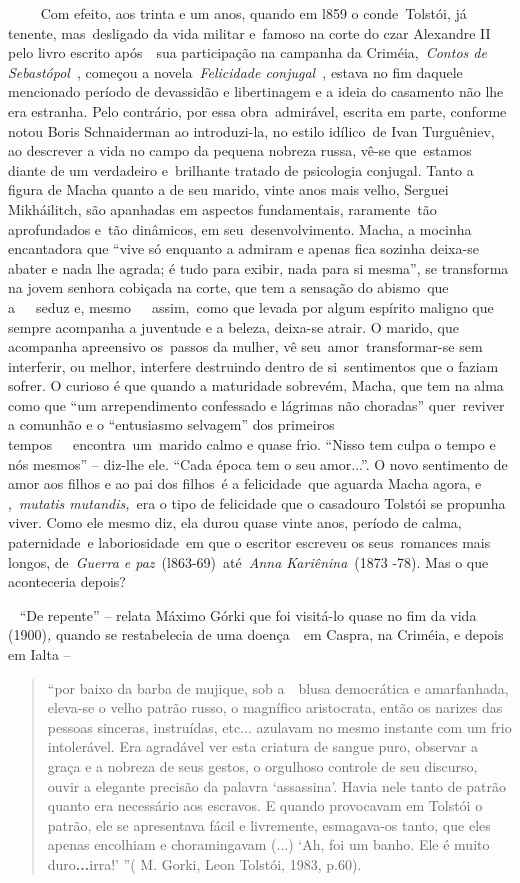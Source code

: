 ~~~~ Com efeito, aos trinta e um anos, quando em l859 o conde~Tolstói,
já tenente, mas~desligado da vida militar e~famoso na corte do czar
Alexandre II pelo livro escrito após~~sua participação na campanha da
Criméia,~\emph{Contos de Sebastópol}~, começou a novela~\emph{Felicidade
conjugal~}, estava no fim daquele mencionado período de devassidão e
libertinagem e a ideia do casamento não lhe era estranha. Pelo
contrário, por essa obra~admirável, escrita em parte, conforme notou
Boris Schnaiderman ao introduzi-la, no estilo idílico~de Ivan
Turguêniev, ao descrever a vida no campo da pequena nobreza russa, vê-se
que~estamos diante de um verdadeiro e~brilhante tratado de psicologia
conjugal. Tanto a figura de Macha quanto a de seu marido, vinte anos
mais velho, Serguei Mikháilitch, são apanhadas em aspectos fundamentais,
raramente~tão aprofundados e~tão dinâmicos, em seu~desenvolvimento.
Macha, a mocinha encantadora que ``vive só enquanto a admiram e apenas
fica sozinha deixa-se abater e nada lhe agrada; é tudo para exibir, nada
para si mesma'', se transforma na jovem senhora cobiçada na corte, que
tem a sensação do abismo~que a~~~seduz e, mesmo~~~assim,~como que levada
por algum espírito maligno que sempre acompanha a juventude e a beleza,
deixa-se atrair. O marido, que acompanha apreensivo os~passos da mulher,
vê seu~amor~transformar-se sem interferir, ou melhor, interfere
destruindo dentro de si~sentimentos que o faziam sofrer. O curioso é que
quando a maturidade sobrevém, Macha, que tem na alma como que ``um
arrependimento confessado e lágrimas não choradas'' quer~reviver a
comunhão e o ``entusiasmo selvagem'' dos primeiros
tempos~~~encontra~um~marido calmo e quase frio. ``Nisso tem culpa o
tempo e nós mesmos'' -- diz-lhe ele. ``Cada época tem o seu amor...''. O
novo sentimento de amor aos filhos e ao pai dos filhos~é a
felicidade~que aguarda Macha agora, e ,~\emph{mutatis mutandis,}~era o
tipo de felicidade que o casadouro Tolstói se propunha viver. Como ele
mesmo diz, ela durou quase vinte anos, período de calma, paternidade~e
laboriosidade~em que o escritor escreveu os seus~romances mais longos,
de~\emph{Guerra e paz}~(l863-69)~até~\emph{Anna Kariênina}~(1873 -78).
Mas o que aconteceria depois?

~ ``De repente'' -- relata Máximo Górki que foi visitá-lo quase no fim
da vida (1900)\emph{,} quando se restabelecia de uma doença~~em Caspra,
na Criméia, e depois em Ialta --

\begin{quote}
``por baixo da barba de mujique, sob a~~blusa democrática e amarfanhada,
eleva-se o velho patrão russo, o magnífico aristocrata, então os narizes
das pessoas sinceras, instruídas, etc... azulavam no mesmo instante com
um frio intolerável. Era agradável ver esta criatura de sangue puro,
observar a graça e a nobreza de seus gestos, o orgulhoso controle de seu
discurso, ouvir a elegante precisão da palavra `assassina'. Havia nele
tanto de patrão quanto era necessário aos escravos. E quando provocavam
em Tolstói o patrão, ele se apresentava fácil e livremente, esmagava-os
tanto, que eles apenas encolhiam e choramingavam (...) `Ah, foi um
banho. Ele é muito duro\textbf{...}irra!' ''( M. Gorki, Leon Tolstói,
1983, p.60).
\end{quote}


